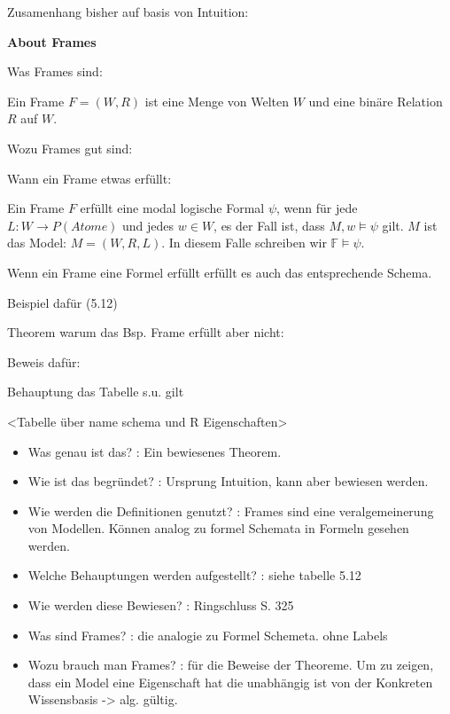 Zusamenhang bisher auf basis von Intuition:



\textbf{About Frames}

Was Frames sind:
\begin{definition}
	\label{def:frame}
	Ein Frame $F = (W,R)$ ist eine Menge von Welten $W$ und eine binäre Relation $R$ auf $W$.
\end{definition}
\cite[S.322]{huth2004logic}

Wozu Frames gut sind:


Wann ein Frame etwas erfüllt:
\begin{definition}
	\label{def:frame_erfuellt}
	Ein Frame $F$ erfüllt eine modal logische Formal $\psi$, wenn für jede  $L: W \rightarrow P(Atome)$ und jedes $w \in W$, es der Fall ist, dass $M,w \vDash \psi$ gilt. $M$ ist das Model: $M = (W,R,L)$.
	In diesem Falle schreiben wir $\mathds{F} \vDash \psi$.
	\cite[S.322f]{huth2004logic}
\end{definition}

Wenn ein Frame eine Formel erfüllt erfüllt es auch das entsprechende Schema.


Beispiel dafür (5.12)

Theorem warum das Bsp. Frame \TFormel erfüllt aber \vierFormel nicht:

Beweis dafür:

Behauptung das Tabelle s.u. gilt

<Tabelle über name schema und R Eigenschaften>











\begin{itemize}
	\item Was genau ist das? : Ein bewiesenes Theorem.
	\item Wie ist das begründet? : Ursprung Intuition, kann aber bewiesen werden.
	\item Wie werden die Definitionen genutzt? : Frames sind eine veralgemeinerung von Modellen. Können analog zu formel Schemata in Formeln gesehen werden.
	\item Welche Behauptungen werden aufgestellt? : siehe tabelle 5.12
	\item Wie werden diese Bewiesen? : Ringschluss S. 325
	\item Was sind Frames? : die analogie zu Formel Schemeta. \KM ohne Labels
	\item Wozu brauch man Frames? : für die Beweise der Theoreme. Um zu zeigen, dass ein Model eine Eigenschaft hat die unabhängig ist von der Konkreten Wissensbasis -> alg. gültig.
\end{itemize}













